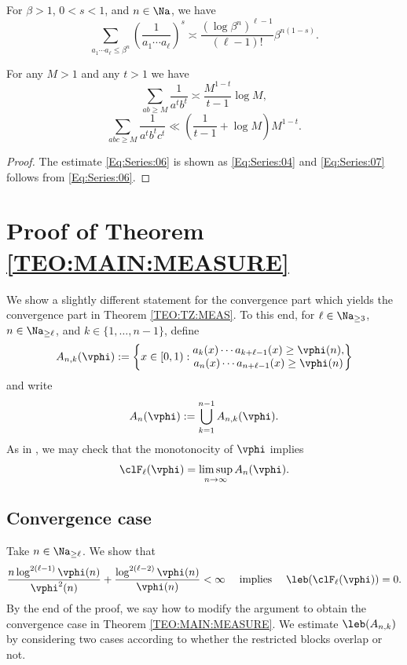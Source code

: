 \documentclass[12pt,a4paper]{amsart}
\begin{document}
 \begin{lem01}
For $\beta>1$, $0<s<1$, and $n\in\Na$, we have
\begin{equation}\label{Eq:Series:05}
\sum_{ a_1\cdots a_{\ell} \leq \beta^n}
\left(\frac{1}{a_1\cdots a_{\ell}} \right)^s
\asymp
\frac{(\log \beta^n)^{{\ell}-1}}{({\ell}-1)!} \beta^{n(1-s)}.  
\end{equation}
\end{lem01}
\begin{lem01}
For any $M>1$ and any $t>1$ we have 
\begin{equation}\label{Eq:Series:06}
\sum_{ab\geq M} \frac{1}{a^tb^t}
\asymp 
\frac{M^{1-t}}{t-1} \log M,
\end{equation}
\begin{equation}\label{Eq:Series:07}
\sum_{abc\geq M} \frac{1}{a^tb^tc^t}
\ll
\left(\frac{1}{t-1} + \log M\right)M^{1-t}.
\end{equation}
\end{lem01}
\begin{proof}
The estimate \eqref{Eq:Series:06} is shown as \eqref{Eq:Series:04} and \eqref{Eq:Series:07} follows from \eqref{Eq:Series:06}.
\end{proof}


\section{Proof of Theorem \ref{TEO:MAIN:MEASURE}}\label{Section:ProofMeasure}
We show a slightly different statement for the convergence part which yields the convergence part in Theorem \ref{TEO:TZ:MEAS}. To this end, for $\ell \in\Na_{\geq 3}$, $n\in\Na_{\geq \ell}$, and $k\in \{1,\ldots, n-1\}$, define
\[
A_{n,k}(\vphi)
:=
\left\{x\in [0,1) : 
\begin{matrix}
a_k(x)\cdots a_{k+\ell - 1}(x) \geq \vphi(n), \\
a_n(x)\cdots a_{n+\ell - 1}(x) \geq \vphi(n)
\end{matrix}
 \right\}
\]
and write
\[
A_n(\vphi)
:=
\bigcup_{k=1}^{n-1} A_{n,k}(\vphi).
\]
As in \cite{TanZhou2024}, we may check that the monotonocity of $\vphi$ implies
\[
\clF_{\ell}(\vphi)
=
\limsup_{n\to\infty} A_n(\vphi).
\]
\subsection{Convergence case}
Take $n\in\Na_{\geq \ell}$. We show that 
\begin{equation}\label{Eq:ConverGen}
\frac{n\log^{2(\ell-1)}\vphi(n)}{\vphi^2(n)} + \frac{\log^{2(\ell-2)}\vphi(n)}{\vphi(n)}<\infty
\quad\text{ implies }\quad
\leb(\clF_{\ell}(\vphi))=0.
\end{equation}
By the end of the proof, we say how to modify the argument to obtain the convergence case in Theorem \ref{TEO:MAIN:MEASURE}.
We estimate $\leb(A_{n,k})$ by considering two cases according to whether the restricted blocks overlap or not.
\end{document}
